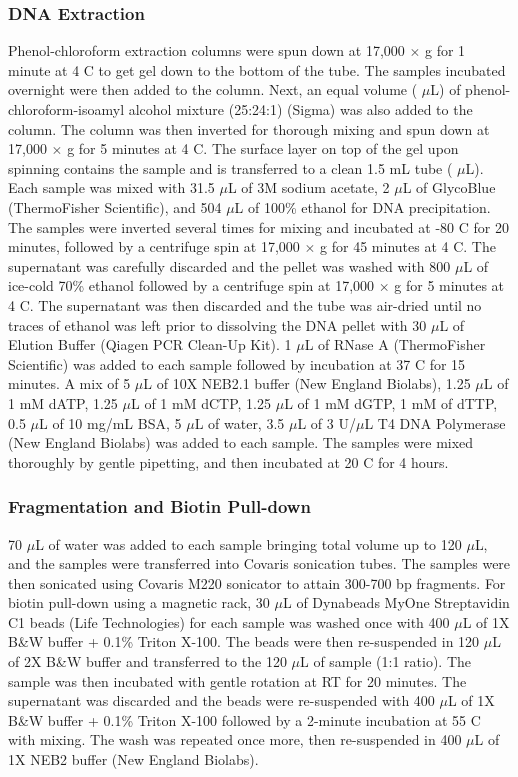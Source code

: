 \subsubsection{DNA Extraction}

Phenol-chloroform extraction columns were spun down at 17,000 $\times$ g for 1 minute at 4 \textdegree C to get gel down to the bottom of the tube.
The samples incubated overnight were then added to the column.
Next, an equal volume ( $\mu$L) of phenol-chloroform-isoamyl alcohol mixture (25:24:1) (Sigma) was also added to the column.
The column was then inverted for thorough mixing and spun down at 17,000 $\times$ g for 5 minutes at 4 \textdegree C.
The surface layer on top of the gel upon spinning contains the sample and is transferred to a clean 1.5 mL tube ( $\mu$L).
Each sample was mixed with 31.5 $\mu$L of 3M sodium acetate, 2 $\mu$L of GlycoBlue (ThermoFisher Scientific), and 504 $\mu$L of 100\% ethanol for DNA precipitation.
The samples were inverted several times for mixing and incubated at -80 \textdegree C for 20 minutes, followed by a centrifuge spin at 17,000 $\times$ g for 45 minutes at 4 \textdegree C.
The supernatant was carefully discarded and the pellet was washed with 800 $\mu$L of ice-cold 70\% ethanol followed by a centrifuge spin at 17,000 $\times$ g for 5 minutes at 4 \textdegree C.
The supernatant was then discarded and the tube was air-dried until no traces of ethanol was left prior to dissolving the DNA pellet with 30 $\mu$L of Elution Buffer (Qiagen PCR Clean-Up Kit).
1 $\mu$L of RNase A (ThermoFisher Scientific) was added to each sample followed by incubation at 37 \textdegree C for 15 minutes.
A mix of 5 $\mu$L of 10X NEB2.1 buffer (New England Biolabs), 1.25 $\mu$L of 1 mM dATP, 1.25 $\mu$L of 1 mM dCTP, 1.25 $\mu$L of 1 mM dGTP, 1 mM of dTTP, 0.5 $\mu$L of 10 mg/mL BSA, 5 $\mu$L of water, 3.5 $\mu$L of 3 U/$\mu$L T4 DNA Polymerase (New England Biolabs) was added to each sample.
The samples were mixed thoroughly by gentle pipetting, and then incubated at 20 \textdegree C for 4 hours.

\subsubsection{Fragmentation and Biotin Pull-down}

70 $\mu$L of water was added to each sample bringing total volume up to 120 $\mu$L, and the samples were transferred into Covaris sonication tubes.
The samples were then sonicated using Covaris M220 sonicator to attain 300-700 bp fragments.
For biotin pull-down using a magnetic rack, 30 $\mu$L of Dynabeads MyOne Streptavidin C1 beads (Life Technologies) for each sample was washed once with 400 $\mu$L of 1X B\&W buffer + 0.1\% Triton X-100.
The beads were then re-suspended in 120 $\mu$L of 2X B\&W buffer and transferred to the 120 $\mu$L of sample (1:1 ratio).
The sample was then incubated with gentle rotation at RT for 20 minutes.
The supernatant was discarded and the beads were re-suspended with 400 $\mu$L of 1X B\&W buffer + 0.1\% Triton X-100 followed by a 2-minute incubation at 55 \textdegree C with mixing.
The wash was repeated once more, then re-suspended in 400 $\mu$L of 1X NEB2 buffer (New England Biolabs).

